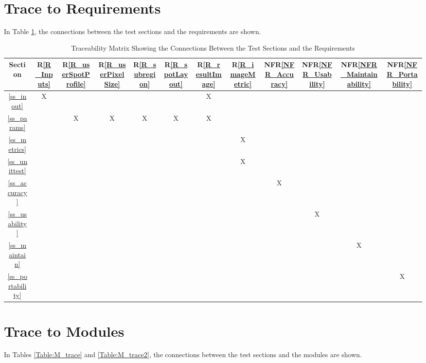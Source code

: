 \documentclass[12pt, titlepage]{article}
\newcommand{\rref}[1]{R\ref{#1}}
\newcommand{\nfrref}[1]{NFR\ref{#1}}
\begin{document}
\section{Trace to Requirements}
In Table \ref{Table:R_trace}, the connections between the test sections and the requirements are shown.

\begin{table}[h]
  \centering
  \begin{tabular}{|c|c|c|c|c|c|c|c|c|c|c|c|}
      \hline
      Section &
      \rref{R_Inputs} & \rref{R_userSpotProfile} & \rref{R_userPixelSize}
      & \rref{R_subregion} & \rref{R_spotLayout} & \rref{R_resultImage} &
      \rref{R_imageMetric} &
      \nfrref{NFR_Accuracy} &
      \nfrref{NFR_Usability} &
      \nfrref{NFR_Maintainability} &
      \nfrref{NFR_Portability}
      \\
      \hline
       \ref{ss_inout}        &X& & & & &X& & & & & \\ \hline
       \ref{ss_params}       & &X&X&X&X&X& & & & & \\ \hline
       \ref{ss_metrics}      & & & & & & &X& & & & \\ \hline
       \ref{ss_unittest}     & & & & & & &X& & & & \\ \hline
       \ref{ss_accuracy}     & & & & & & & &X& & & \\ \hline
       \ref{ss_usability}    & & & & & & & & &X& & \\ \hline
       \ref{ss_maintain}     & & & & & & & & & &X& \\ \hline
       \ref{ss_portability}  & & & & & & & & & & &X\\ \hline
  \end{tabular}
  \caption{Traceability Matrix Showing the Connections Between the Test Sections
    and the Requirements}
  \label{Table:R_trace}
\end{table}

\section{Trace to Modules}
In Tables \ref{Table:M_trace} and \ref{Table:M_trace2},
the connections between the test sections and the modules are shown.
\end{document}
